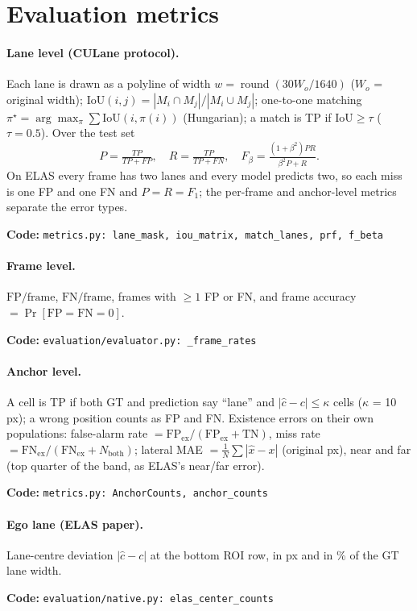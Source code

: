 \documentclass[10pt,a4paper]{article}
\newcommand{\impl}[1]{\par\noindent\textcolor{blue!50!black}{\small\textbf{Code:} \texttt{#1}}\par}
\theoremstyle{definition}
\begin{document}
\section{Evaluation metrics}
\paragraph{Lane level (CULane protocol).} Each lane is drawn as a polyline of width $w=\operatorname{round}(30W_o/1640)$
($W_o$ = original width); $\mathrm{IoU}(i,j)=|M_i\cap M_j|/|M_i\cup M_j|$; one-to-one matching
$\pi^\star=\arg\max_\pi\sum\mathrm{IoU}(i,\pi(i))$ (Hungarian); a match is TP if $\mathrm{IoU}\ge\tau$
($\tau=0.5$). Over the test set
\begin{equation}
P=\tfrac{TP}{TP+FP},\quad R=\tfrac{TP}{TP+FN},\quad F_\beta=\tfrac{(1+\beta^2)PR}{\beta^2P+R}.
\end{equation}
On ELAS every frame has two lanes and every model predicts two, so each miss is one FP and one FN and $P=R=F_1$;
the per-frame and anchor-level metrics separate the error types.
\impl{metrics.py: lane\_mask, iou\_matrix, match\_lanes, prf, f\_beta}

\paragraph{Frame level.} $\mathrm{FP}/\mathrm{frame}$, $\mathrm{FN}/\mathrm{frame}$, frames with $\ge1$ FP or FN, and
frame accuracy $=\Pr[\mathrm{FP}=\mathrm{FN}=0]$. \impl{evaluation/evaluator.py: \_frame\_rates}

\paragraph{Anchor level.} A cell is TP if both GT and prediction say ``lane'' and $|\hat c-c|\le\kappa$ cells
($\kappa$ = 10\,px); a wrong position counts as FP and FN. Existence errors on their own populations:
false-alarm rate $=\mathrm{FP_{ex}}/(\mathrm{FP_{ex}}+\mathrm{TN})$, miss rate $=\mathrm{FN_{ex}}/(\mathrm{FN_{ex}}+N_{\mathrm{both}})$;
lateral MAE $=\frac1N\sum|\hat x-x|$ (original px), near and far (top quarter of the band, as ELAS's near/far error).
\impl{metrics.py: AnchorCounts, anchor\_counts}

\paragraph{Ego lane (ELAS paper).} Lane-centre deviation $|\hat c-c|$ at the bottom ROI row, in px and in \% of the GT
lane width. \impl{evaluation/native.py: elas\_center\_counts}
\end{document}
